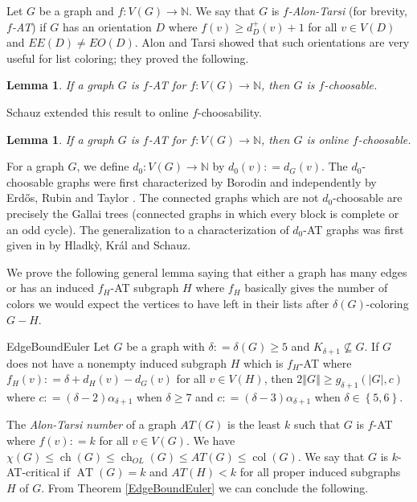 \documentclass[12pt]{article}
\theoremstyle{plain}
\newtheorem{lem}[thm]{Lemma}
\theoremstyle{definition}
\theoremstyle{remark}
\newcommand{\IN}{\mathbb{N}}
\newcommand{\set}[1]{\left\{ #1 \right\}}
\newcommand{\card}[1]{\left|#1\right|}
\newcommand{\size}[1]{\left\Vert#1\right\Vert}
\newcommand{\func}[3]{#1\colon #2 \rightarrow #3}
\newcommand{\DefinedAs}{\mathrel{\mathop:}=}
\newcommand{\AT}{\operatorname{AT}}
\newcommand{\col}{\operatorname{col}}
\newcommand{\ch}{\operatorname{ch}}
\begin{document}
Let $G$ be a graph and $\func{f}{V(G)}{\IN}$.  We say that $G$ is \emph{$f$-Alon-Tarsi} (for brevity, \emph{$f$-AT}) if $G$ has an orientation $D$ where $f(v) \geq d_{D}^+(v) + 1$ for all $v \in V(D)$ and $EE(D) \neq EO(D)$.  Alon and Tarsi \cite{Alon1992125} showed that such orientations are very useful for list coloring; they proved the following.

\begin{lem}\label{AlonTarsi}
If a graph $G$ is $f$-AT for $\func{f}{V(G)}{\IN}$, then $G$ is $f$-choosable.
\end{lem}

\noindent Schauz \cite{schauz2010flexible} extended this result to online $f$-choosability.

\begin{lem}\label{Schauz}
If a graph $G$ is $f$-AT for $\func{f}{V(G)}{\IN}$, then $G$ is online $f$-choosable.
\end{lem}

For a graph $G$, we define $\func{d_0}{V(G)}{\IN}$ by $d_0(v) \DefinedAs d_G(v)$.  The $d_0$-choosable graphs were first characterized by Borodin \cite{borodin1977criterion} and independently by Erd\H{o}s, Rubin and Taylor \cite{erdos1979choosability}.  The connected graphs which are not $d_0$-choosable are precisely the Gallai trees (connected graphs in which every block is complete or an odd cycle). The generalization to a characterization of $d_0$-AT graphs was first given in \cite{Hladky} by Hladk{\`y}, Kr{\'a}l and Schauz. 

We prove the following general lemma saying that either a graph has many edges or has an induced $f_H$-AT subgraph $H$ where $f_H$ basically gives the number of colors we would expect the vertices to have left in their lists after $\delta(G)$-coloring $G-H$. 

\begin{repthm}{EdgeBoundEuler}
Let $G$ be a graph with $\delta \DefinedAs \delta(G) \geq 5$ and $K_{\delta + 1} \not \subseteq G$. If $G$ does not have a nonempty induced subgraph $H$ which is $f_H$-AT where $f_H(v) \DefinedAs \delta + d_H(v) - d_G(v)$ for all $v \in V(H)$, then $2\size{G} \geq g_{\delta+1}(\card{G}, c)$ where $c \DefinedAs (\delta-2)\alpha_{\delta + 1}$ when $\delta \geq 7$ and $c \DefinedAs (\delta-3)\alpha_{\delta + 1}$ when $\delta \in \set{5,6}$.
\end{repthm}

The \emph{Alon-Tarsi number} of a graph $AT(G)$ is the least $k$ such that $G$ is $f$-AT where $f(v) \DefinedAs k$ for all $v \in V(G)$. We have $\chi(G) \leq \ch(G) \leq \ch_{OL}(G) \leq AT(G) \leq \col(G)$.  We say that $G$ is $k$-AT-critical if $\AT(G) = k$ and $AT(H) < k$ for all proper induced subgraphs $H$ of $G$.  From Theorem \ref{EdgeBoundEuler} we can conclude the following.
\end{document}
